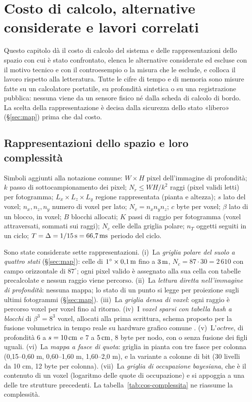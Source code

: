 \section{Costo di calcolo, alternative considerate e lavori correlati}\label{sec:cos}

Questo capitolo dà il costo di calcolo del sistema e delle rappresentazioni dello spazio con cui è stato confrontato, elenca le alternative considerate ed escluse con il motivo tecnico e con il controesempio o la misura che le esclude, e colloca il lavoro rispetto alla letteratura. Tutte le cifre di tempo e di memoria sono misure fatte su un calcolatore portatile, su profondità sintetica o su una registrazione pubblica: nessuna viene da un sensore fisico né dalla scheda di calcolo di bordo. La scelta della rappresentazione è decisa dalla sicurezza dello stato «libero» (\S\ref{sec:map}) prima che dal costo.

\subsection{Rappresentazioni dello spazio e loro complessità}\label{sec:cos-rappresentazioni}

Simboli aggiunti alla notazione comune: $W\times H$ pixel dell'immagine di profondità; $k$ passo di sottocampionamento dei pixel; $N_r\le WH/k^2$ raggi (pixel validi letti) per fotogramma; $L_x\times L_z\times L_y$ regione rappresentata (pianta e altezza); $s$ lato del voxel; $n_x,n_z,n_y$ numero di voxel per lato; $N_v=n_xn_yn_z$; $c$ byte per voxel; $\beta$ lato di un blocco, in voxel; $B$ blocchi allocati; $K$ passi di raggio per fotogramma (voxel attraversati, sommati sui raggi); $N_c$ celle della griglia polare; $n_T$ oggetti seguiti in un ciclo; $T=\Delta=1/15\,\mathrm{s}=66{,}7\,\mathrm{ms}$ periodo del ciclo.

Sono state considerate sette rappresentazioni. (i)~La \emph{griglia polare del suolo a quattro stati} (\S\ref{sec:map}): celle di $1^\circ\times0{,}1\,\mathrm{m}$ fino a $3\,\mathrm{m}$, $N_c=87\cdot30=2\,610$ con campo orizzontale di $87^\circ$; ogni pixel valido è assegnato alla sua cella con tabelle precalcolate e nessun raggio viene percorso. (ii)~La \emph{lettura diretta nell'immagine di profondità}: nessuna mappa; lo stato di un punto si legge per proiezione sugli ultimi fotogrammi (\S\ref{sec:map}). (iii)~La \emph{griglia densa di voxel}: ogni raggio è percorso voxel per voxel fino al ritorno. (iv)~I \emph{voxel sparsi con tabella hash a blocchi} di $\beta^3=8^3$ voxel, allocati alla prima scrittura, schema proposto per la fusione volumetrica in tempo reale su hardware grafico comune \cite{niessner2013}. (v)~L'\emph{octree}, di profondità 6 a $s=10\,\mathrm{cm}$ e 7 a $5\,\mathrm{cm}$, 8 byte per nodo, con o senza fusione dei figli uguali. (vi)~La \emph{mappa a fasce di quota}: griglia in pianta con tre fasce per colonna (0,15--0,60 m, 0,60--1,60 m, 1,60--2,0 m), e la variante a colonne di bit (30 livelli da 10 cm, 12 byte per colonna). (vii)~La \emph{griglia di occupazione bayesiana}, che è il contenuto di un voxel (logaritmo delle quote di occupazione) e si appoggia a una delle tre strutture precedenti. La tabella~\ref{tab:cos-complessita} ne riassume la complessità.

